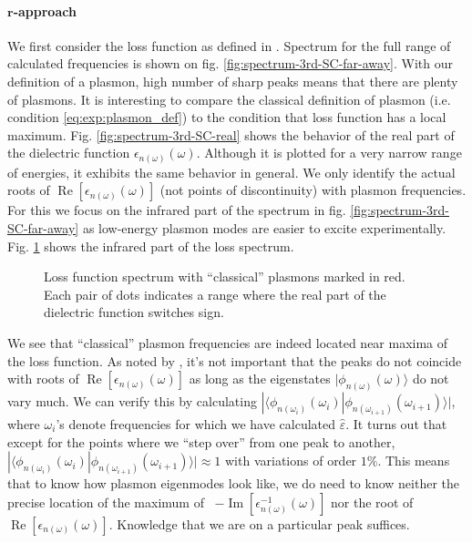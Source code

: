 \documentclass[a4paper,12pt]{article}
\begin{document}
    \paragraph{$\mathbf{r}$-approach} We first consider the loss function as defined in \cite{plasmonic2015}. Spectrum for the full range of calculated frequencies is shown on fig. \ref{fig:spectrum-3rd-SC-far-away}. 
    With our definition of a plasmon, high number of sharp peaks means that there are plenty of plasmons. It is interesting to compare the classical definition of plasmon (i.e. condition \eqref{eq:exp:plasmon_def}) to the condition that loss function has a local maximum. Fig. \ref{fig:spectrum-3rd-SC-real} shows the behavior of the real part of the dielectric function $\epsilon_{n(\omega)}(\omega)$. Although it is plotted for a very narrow range of energies, it exhibits the same behavior in general. We only identify the actual roots of $\operatorname{Re} [\epsilon_{n(\omega)}(\omega)]$ (not points of discontinuity) with plasmon frequencies. For this we focus on the infrared part of the spectrum in fig. \ref{fig:spectrum-3rd-SC-far-away} as low-energy plasmon modes are easier to excite experimentally. Fig. \ref{fig:spectrum-3rd-SC} shows the infrared part of the loss spectrum.
    \begin{figure}[h] 
    \center
    
    \caption{Loss function spectrum with ``classical'' plasmons marked in red. Each pair of dots indicates a range where the real part of the dielectric function switches sign.}
    \label{fig:spectrum-3rd-SC}
    \end{figure}

    We see that ``classical'' plasmon frequencies are indeed located near maxima of the loss function. As noted by \cite{andersen2012spatially}, it's not important that the peaks do not coincide with roots of $\operatorname{Re} [\epsilon_{n(\omega)}(\omega)]$ as long as the eigenstates $|\phi_{n(\omega)}(\omega)\rangle$ do not vary much. We can verify this by calculating $|\langle \phi_{n(\omega_i)}(\omega_i) | \phi_{n(\omega_{i+1})}(\omega_{i+1}) \rangle|$, where $\omega_i$'s denote frequencies for which we have calculated $\hat\varepsilon$. It turns out that except for the points where we ``step over'' from one peak to another, $|\langle \phi_{n(\omega_i)}(\omega_i) | \phi_{n(\omega_{i+1})}(\omega_{i+1}) \rangle| \approx 1$ with variations of order $1\%$. This means that to know how plasmon eigenmodes look like, we do need to know neither the precise location of the maximum of \ $-\operatorname{Im}[\epsilon_{n(\omega)}^{-1}(\omega)]$ nor the root of $\operatorname{Re} [\epsilon_{n(\omega)}(\omega)]$. Knowledge that we are on a particular peak suffices. 
\end{document}
